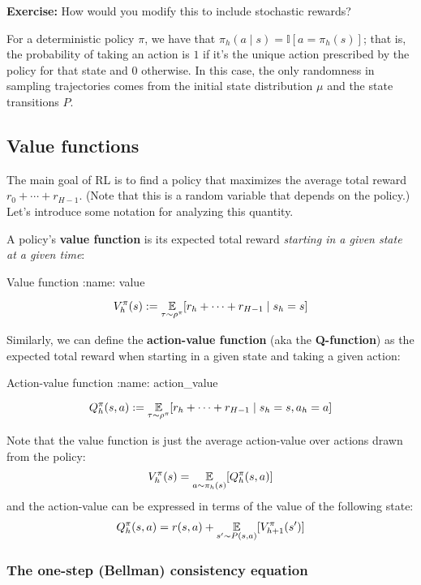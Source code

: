 \documentclass[\main/main]{subfiles}
\begin{document}
\textbf{Exercise:} How would you modify this to include stochastic rewards?

For a deterministic policy $\pi$, we have that $\pi_h(a \mid s) = \mathbb{I}[a = \pi_h(s)]$; that is, the probability of taking an action is $1$ if it's the unique action prescribed by the policy for that state and $0$ otherwise. In this case, the only randomness in sampling trajectories comes from the initial state distribution $\mu$ and the state transitions $P$.

\subsection{Value functions}

The main goal of RL is to find a policy that maximizes the average total reward $r_0 + \cdots + r_{H-1}$. (Note that this is a random variable that depends on the policy.) Let's introduce some notation for analyzing this quantity.

A policy's \textbf{value function} is its expected total reward \emph{starting in a given state at a given time}:

\begin{definition}{Value function}
:name: value

    \[
        V_h^\pi(s) := \operatorname*{\mathbb{E}}_{\tau \sim \rho^\pi} [r_h + \cdots + r_{H-1} \mid s_h = s]
    \]
\end{definition}

Similarly, we can define the \textbf{action-value function} (aka the \textbf{Q-function}) as the expected total reward when starting in a given state and taking a given action:

\begin{definition}{Action-value function}
:name: action_value

    \[
        Q_h^\pi(s, a) := \operatorname*{\mathbb{E}}_{\tau \sim \rho^\pi} [r_h + \cdots + r_{H-1} \mid s_h = s, a_h = a]
    \]
\end{definition}

Note that the value function is just the average action-value over actions drawn from the policy:
\[
    V_h^\pi(s) = \operatorname*{\mathbb{E}}_{a \sim \pi_h(s)} [Q_h^\pi(s, a)]
\]
and the action-value can be expressed in terms of the value of the following state:
\[
    Q_h^\pi(s, a) = r(s, a) + \operatorname*{\mathbb{E}}_{s' \sim P(s, a)} [V_{h+1}^\pi(s')]
\]

\subsubsection{The one-step (Bellman) consistency equation}
\end{document}
